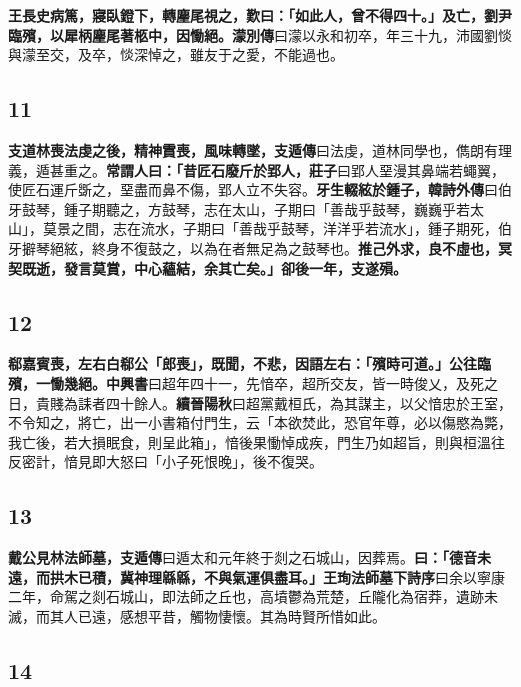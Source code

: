 \textbf{王長史病篤，寢臥鐙下，轉麈尾視之，歎曰：「如此人，曾不得四十。」及亡，劉尹臨殯，以犀柄麈尾著柩中，因慟絕。}{\footnotesize \textbf{濛別傳}曰濛以永和初卒，年三十九，沛國劉惔與濛至交，及卒，惔深悼之，雖友于之愛，不能過也。}

\subsection*{11}

\textbf{支道林喪法虔之後，精神霣喪，風味轉墜，}{\footnotesize \textbf{支遁傳}曰法虔，道林同學也，儁朗有理義，遁甚重之。}\textbf{常謂人曰：「昔匠石廢斤於郢人，}{\footnotesize \textbf{莊子}曰郢人堊漫其鼻端若蠅翼，使匠石運斤斲之，堊盡而鼻不傷，郢人立不失容。}\textbf{牙生輟絃於鍾子，}{\footnotesize \textbf{韓詩外傳}曰伯牙鼓琴，鍾子期聽之，方鼓琴，志在太山，子期曰「善哉乎鼓琴，巍巍乎若太山」，莫景之間，志在流水，子期曰「善哉乎鼓琴，洋洋乎若流水」，鍾子期死，伯牙擗琴絕絃，終身不復鼓之，以為在者無足為之鼓琴也。}\textbf{推己外求，良不虛也，冥契既逝，發言莫賞，中心蘊結，余其亡矣。」卻後一年，支遂殞。}

\subsection*{12}

\textbf{郗嘉賓喪，左右白郗公「郎喪」，既聞，不悲，因語左右：「殯時可道。」公往臨殯，一慟幾絕。}{\footnotesize \textbf{中興書}曰超年四十一，先愔卒，超所交友，皆一時俊乂，及死之日，貴賤為誄者四十餘人。\textbf{續晉陽秋}曰超黨戴桓氏，為其謀主，以父愔忠於王室，不令知之，將亡，出一小書箱付門生，云「本欲焚此，恐官年尊，必以傷愍為斃，我亡後，若大損眠食，則呈此箱」，愔後果慟悼成疾，門生乃如超旨，則與桓溫往反密計，愔見即大怒曰「小子死恨晚」，後不復哭。}

\subsection*{13}

\textbf{戴公見林法師墓，}{\footnotesize \textbf{支遁傳}曰遁太和元年終于剡之石城山，因葬焉。}\textbf{曰：「德音未遠，而拱木已積，冀神理緜緜，不與氣運俱盡耳。」}{\footnotesize \textbf{王珣法師墓下詩序}曰余以寧康二年，命駕之剡石城山，即法師之丘也，高墳鬱為荒楚，丘隴化為宿莽，遺跡未滅，而其人已遠，感想平昔，觸物悽懷。其為時賢所惜如此。}

\subsection*{14}

